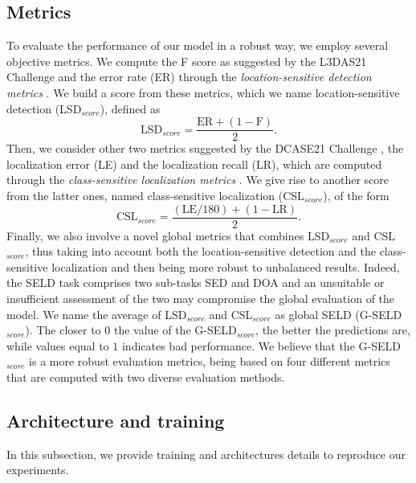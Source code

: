 \documentclass[3p, preprint, twocolumn]{elsarticle}
\begin{document}
\subsection{Metrics}
To evaluate the performance of our model in a robust way, we employ several objective metrics. We compute the F score as suggested by the L3DAS21 Challenge and the error rate (ER) through the \textit{location-sensitive detection metrics} \cite{guizzo2021l3das21, Guizzo2022L3DAS22CL}. We build a score from these metrics, which we name location-sensitive detection (LSD$_{score}$), defined as
\begin{equation}
    \text{LSD}_{score} = \frac{\text{ER}+\left(1-\text{F}\right)}{2}.
\end{equation}
Then, we consider other two metrics suggested by the DCASE21 Challenge \cite{Politis2021OverviewAE}, the localization error (LE) and the localization recall (LR), which are computed through the \textit{class-sensitive localization metrics} \cite{Mesaros2019Measurement}. We give rise to another score from the latter ones, named class-sensitive localization (CSL$_{score}$), of the form
\begin{equation}
    \text{CSL}_{score} = \frac{\left(\text{LE}/180\right)+\left(1-\text{LR}\right)}{2}.
\end{equation}
Finally, we also involve a novel global metrics that combines LSD$_{score}$ and CSL$_{score}$, thus taking into account both the location-sensitive detection and the class-sensitive localization and then being more robust to unbalanced results. Indeed, the SELD task comprises two sub-tasks SED and DOA and an unsuitable or insufficient assessment of the two may compromise the global evaluation of the model. We name the average of LSD$_{score}$ and CSL$_{score}$ as global SELD (G-SELD$_{score}$). The closer to $0$ the value of the G-SELD$_{score}$, the better the predictions are, while values equal to $1$ indicates bad performance. We believe that the G-SELD$_{score}$ is a more robust evaluation metrics, being based on four different metrics that are computed with two diverse evaluation methods.

\subsection{Architecture and training}
In this subsection, we provide training and architectures details to reproduce our experiments.
\end{document}
